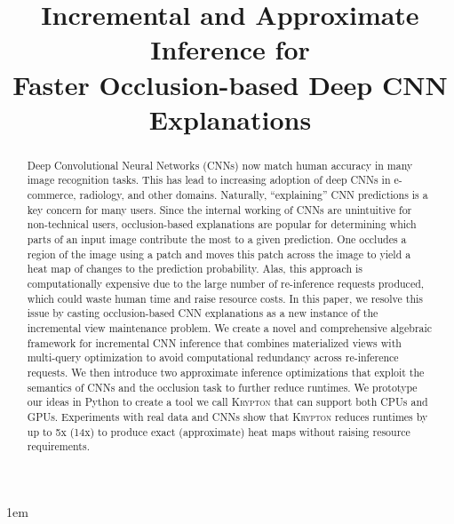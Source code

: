 \documentclass[10pt, sigconf]{acmart}
\begin{document}
\emergencystretch 1em

\title{Incremental and Approximate Inference for\\Faster Occlusion-based Deep CNN Explanations}



\begin{abstract}
Deep Convolutional Neural Networks (CNNs) now match human accuracy in many image recognition tasks. This has lead to increasing adoption of deep CNNs in e-commerce, radiology, and other domains. Naturally, ``explaining'' CNN predictions is a key concern for many users. Since the internal working of CNNs are unintuitive for non-technical users, occlusion-based explanations are popular for determining which parts of an input image contribute the most to a given prediction. One occludes a region of the image using a patch and moves this patch across the image to yield a heat map of changes to the prediction probability. Alas, this approach is computationally expensive due to the large number of re-inference requests produced, which could waste human time and raise resource costs. In this paper, we resolve this issue by casting occlusion-based CNN explanations as a new instance of the incremental view maintenance problem. We create a novel and comprehensive algebraic framework for incremental CNN inference that combines materialized views with multi-query optimization to avoid computational redundancy across re-inference requests. We then introduce two approximate inference optimizations that exploit the semantics of CNNs and the occlusion task to further reduce runtimes. We prototype our ideas in Python to create a tool we call \textsc{Krypton} that can support both CPUs and GPUs. Experiments with real data and CNNs show that \textsc{Krypton} reduces runtimes by up to 5x (14x) to produce exact (approximate) heat maps without raising resource requirements.
\end{abstract}

\maketitle



% 




\end{document}
